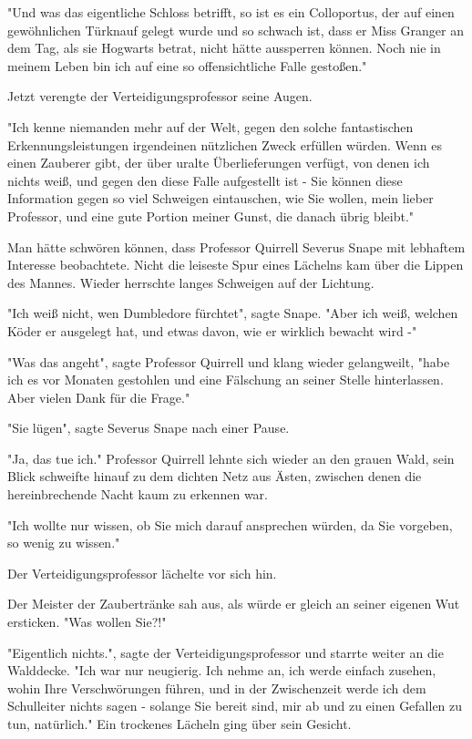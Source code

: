 {"Und was das eigentliche Schloss betrifft, so ist es ein Colloportus, der auf einen gewöhnlichen Türknauf gelegt wurde und so schwach ist, dass er Miss Granger an dem Tag, als sie Hogwarts betrat, nicht hätte aussperren können. Noch nie in meinem Leben bin ich auf eine so offensichtliche Falle gestoßen."

Jetzt verengte der Verteidigungsprofessor seine Augen.

"Ich kenne niemanden mehr auf der Welt, gegen den solche fantastischen Erkennungsleistungen irgendeinen nützlichen Zweck erfüllen würden. Wenn es einen Zauberer gibt, der über uralte Überlieferungen verfügt, von denen ich nichts weiß, und gegen den diese Falle aufgestellt ist - Sie können diese Information gegen so viel Schweigen eintauschen, wie Sie wollen, mein lieber Professor, und eine gute Portion meiner Gunst, die danach übrig bleibt."

Man hätte schwören können, dass Professor Quirrell Severus Snape mit lebhaftem Interesse beobachtete. Nicht die leiseste Spur eines Lächelns kam über die Lippen des Mannes. Wieder herrschte langes Schweigen auf der Lichtung.

"Ich weiß nicht, wen Dumbledore fürchtet", sagte Snape. "Aber ich weiß, welchen Köder er ausgelegt hat, und etwas davon, wie er wirklich bewacht wird -"

"Was das angeht", sagte Professor Quirrell und klang wieder gelangweilt, "habe ich es vor Monaten gestohlen und eine Fälschung an seiner Stelle hinterlassen. Aber vielen Dank für die Frage."

"Sie lügen", sagte Severus Snape nach einer Pause.

"Ja, das tue ich." Professor Quirrell lehnte sich wieder an den grauen Wald, sein Blick schweifte hinauf zu dem dichten Netz aus Ästen, zwischen denen die hereinbrechende Nacht kaum zu erkennen war.

"Ich wollte nur wissen, ob Sie mich darauf ansprechen würden, da Sie vorgeben, so wenig zu wissen."

Der Verteidigungsprofessor lächelte vor sich hin.

Der Meister der Zaubertränke sah aus, als würde er gleich an seiner eigenen Wut ersticken. "Was wollen Sie?!"

"Eigentlich nichts.", sagte der Verteidigungsprofessor und starrte weiter an die Walddecke. "Ich war nur neugierig. Ich nehme an, ich werde einfach zusehen, wohin Ihre Verschwörungen führen, und in der Zwischenzeit werde ich dem Schulleiter nichts sagen - solange Sie bereit sind, mir ab und zu einen Gefallen zu tun, natürlich." Ein trockenes Lächeln ging über sein Gesicht.

}
